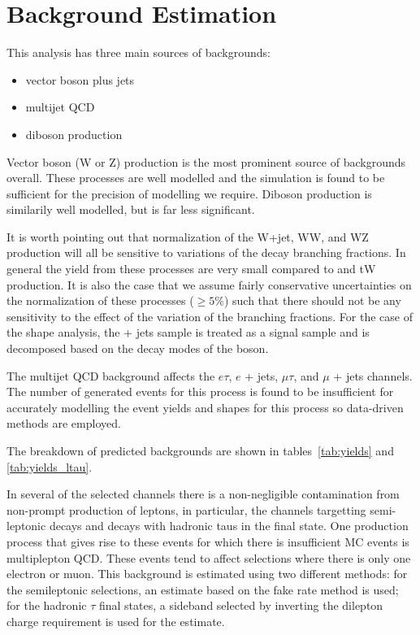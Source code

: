 \section{Background Estimation}
\label{sec:analysis:background}





This analysis has three main sources of backgrounds:

\begin{itemize}
    \item vector boson plus jets
    \item multijet QCD
    \item diboson production
\end{itemize}

Vector boson (W or Z) production is the most prominent source of backgrounds overall.  These processes are well modelled and the simulation is found to be sufficient for the precision of modelling we require.  Diboson production is similarily well modelled, but is far less significant.  

It is worth pointing out that normalization of the W+jet, WW, and WZ production will all be sensitive to variations of the \PW decay branching fractions.  In general the yield from these processes are very small compared to \ttbar and tW production.  It is also the case that we assume fairly conservative uncertainties on the normalization of these processes ($\geq 5\%$) such that there should not be any sensitivity to the effect of the variation of the branching fractions.  For the case of the shape analysis, the \PW + jets sample is treated as a signal sample and is decomposed based on the decay modes of the \PW boson.  

The multijet QCD background affects the $e\tau$, $e$ + jets, $\mu\tau$, and $\mu$ + jets channels.  The number of generated events for this process is found to be insufficient for accurately modelling the event yields and shapes for this process so data-driven methods are employed.

The breakdown of predicted backgrounds are shown in tables~\ref{tab:yields} and \ref{tab:yields_ltau}.   


In several of the selected channels there is a non-negligible contamination from non-prompt production of leptons, in particular, the channels targetting semi-leptonic \ttbar decays and decays with hadronic taus in the final state.  One production process that gives rise to these events for which there is insufficient MC events is multiplepton QCD.  These events tend to affect selections where there is only one electron or muon.  This background is estimated using two different methods: for the semileptonic \ttbar selections, an estimate based on the fake rate method is used; for the hadronic $\tau$ final states, a sideband selected by inverting the dilepton charge requirement is used for the estimate.




